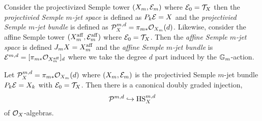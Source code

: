 \documentclass[12pt]{article}
\begin{document}
\begin{defn}
Consider the projectivized Semple tower $(X_m, \mathcal{E}_m)$ where $\mathcal{E}_0 = \mathcal{T}_X$ then the \textit{projectivied Semple $m$-jet space} is defined as $P_k \mathcal{E} = X$ and the \textit{projectivied Semple $m$-jet bundle} is defined as $\mathcal{P}^{m,d}_X = \pi_{m*} \mathcal{O}_{X_m}(d)$. Likewise, consider the affine Semple tower $(X_m^{\mathrm{aff}}, \mathcal{E}_m^{\mathrm{aff}})$ where $\mathcal{E}_0 = \mathcal{T}_X$. Then the \textit{affine Semple $m$-jet space} is defined $J_m X = X_m^{\mathrm{aff}}$ and the \textit{affine Semple $m$-jet bundle} is $\mathcal{E}^{m,d} = [\pi_{m*} \mathcal{O}_{X^{\mathrm{aff}}_m}]_d$ where we take the degree $d$ part induced by the $\mathbb{G}_m$-action.
\end{defn}

\begin{prop}
Let $\mathcal{P}^{m,d}_X = \pi_{m*} \mathcal{O}_{X_m}(d)$ where $(X_m, \mathcal{E}_m)$ is the projectivied Semple $m$-jet bundle $P_k \mathcal{E} = X_k$ with $\mathcal{E}_0 = \mathcal{T}_X$. Then there is a canonical doubly graded injection,
\[ \mathcal{P}^{m,d} \hookrightarrow \mathrm{HS}^{m,d}_{X} \] 
of $\mathcal{O}_{X}$-algebras.
\end{prop}
\end{document}
